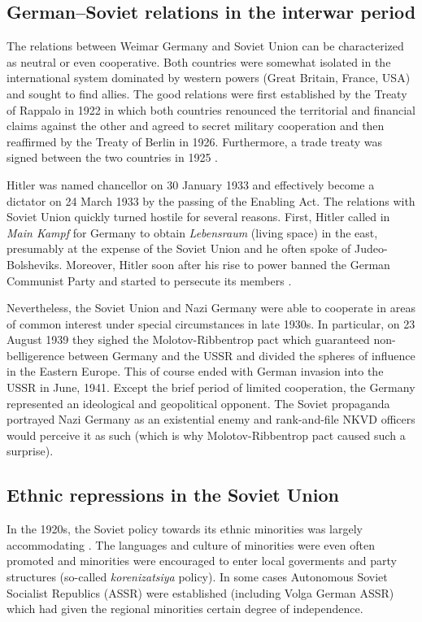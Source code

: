 \subsection{German–Soviet relations in the interwar period}
The relations between Weimar Germany and Soviet Union can be characterized as neutral or even cooperative. Both countries were somewhat isolated in the international system dominated by western powers (Great Britain, France, USA) and sought to find allies. The good relations were first established by the Treaty of Rappalo in 1922 in which both countries renounced the territorial and financial claims against the other and agreed to secret military cooperation \citep{gatzke_russo-german_1958} and then reaffirmed by the Treaty of Berlin in 1926. Furthermore, a trade treaty was signed between the two countries in 1925 \citep{morgan_political_1963}.

Hitler was named chancellor on 30 January 1933 and effectively become a dictator on 24 March 1933 by the passing of the Enabling Act. 
The relations with Soviet Union quickly turned hostile for several reasons.  First, Hitler called in \emph{Main Kampf} for Germany to obtain \emph{Lebensraum} (living space) in the east, presumably at the expense of the Soviet Union and he often spoke of Judeo-Bolsheviks. Moreover, Hitler soon after his rise to power banned the German Communist Party and started to persecute its members  \citep{haslam_soviet_1984}. 

Nevertheless, the Soviet Union and Nazi Germany were able to cooperate in
areas of common interest under special circumstances in late 1930s. In
particular, on 23 August 1939 they sighed the  Molotov-Ribbentrop pact which guaranteed non-belligerence between Germany and the USSR and divided
the spheres of influence in the Eastern Europe. This of course ended with
German invasion into the USSR in June, 1941.  
Except the brief period of limited cooperation, the Germany represented an ideological and geopolitical opponent. The Soviet propaganda portrayed Nazi
Germany as an existential enemy and rank-and-file NKVD officers would
perceive it as such (which is why Molotov-Ribbentrop pact caused such a surprise). 
\subsection{Ethnic repressions in the Soviet Union}
In the 1920s, the Soviet policy towards its ethnic minorities was largely accommodating \citep{martin_affirmative_2001}. The languages and culture of minorities were even often promoted and minorities were encouraged to enter local goverments and party structures (so-called \emph{korenizatsiya} policy). In some cases Autonomous Soviet Socialist Republics (ASSR) were established (including Volga German ASSR) which had given the regional minorities certain degree of independence.  

